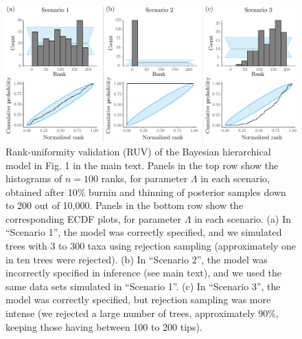 \documentclass[oneside]{article}
\begin{document}
\begin{figure}[!ht]
   \includegraphics[width=\linewidth]{../figures/sbc_Yule_lambda_manual.pdf}
  \caption{Rank-uniformity validation (RUV) of the Bayesian hierarchical model in Fig. 1 in the main text.
    Panels in the top row show the histograms of $n=100$ ranks, for parameter $\Lambda$ in each scenario, obtained after 10\% burnin and thinning of posterior samples down to 200 out of 10,000.
    Panels in the bottom row show the corresponding ECDF plots, for parameter $\Lambda$ in each scenario.
    (a) In ``Scenario 1'', the model was correctly specified, and we simulated trees with 3 to 300 taxa using rejection sampling (approximately one in ten trees were rejected).
    (b) In ``Scenario 2'', the model was incorrectly specified in inference (see main text), and we used the same data sets simulated in ``Scenario 1''.
    (c) In ``Scenario 3'', the model was correctly specified, but rejection sampling was more intense (we rejected a large number of trees, approximately 90\%, keeping those having between 100 to 200 tips).
   }
  \label{supfig:ruv_yule_lambda}
\end{figure}

\clearpage


\end{document}
